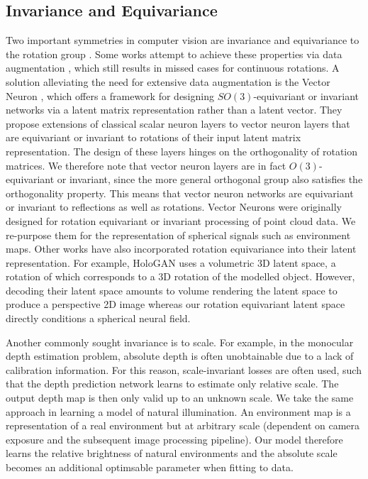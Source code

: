 \subsection{Invariance and Equivariance}\label{sec:litrevinv}

Two important symmetries in computer vision are invariance and equivariance to the rotation group \cite{bronstein_geometric_2021}. Some works attempt to achieve these properties via data augmentation \cite{yu_outdoor_2021, qi_pointnet_2017, sztrajman_high-dynamic-range_2020}, which still results in missed cases for continuous rotations. A solution alleviating the need for extensive data augmentation is the Vector Neuron \cite{deng_vector_2021}, which offers a framework for designing $SO(3)$-equivariant or invariant networks via a latent matrix representation rather than a latent vector. They propose extensions of classical scalar neuron layers to vector neuron layers that are equivariant or invariant to rotations of their input latent matrix representation. The design of these layers hinges on the orthogonality of rotation matrices. We therefore note that vector neuron layers are in fact $O(3)$-equivariant or invariant, since the more general orthogonal group also satisfies the orthogonality property. This means that vector neuron networks are equivariant or invariant to reflections as well as rotations. Vector Neurons were originally designed for rotation equivariant or invariant processing of point cloud data. We re-purpose them for the representation of spherical signals such as environment maps. Other works have also incorporated rotation equivariance into their latent representation. For example, HoloGAN \cite{nguyen2019hologan} uses a volumetric 3D latent space, a rotation of which corresponds to a 3D rotation of the modelled object. However, decoding their latent space amounts to volume rendering the latent space to produce a perspective 2D image whereas our rotation equivariant latent space directly conditions a spherical neural field.

Another commonly sought invariance is to scale. For example, in the monocular depth estimation problem, absolute depth is often unobtainable due to a lack of calibration information. For this reason, scale-invariant losses \cite{eigenDepthMapPrediction2014} are often used, such that the depth prediction network learns to estimate only relative scale. The output depth map is then only valid up to an unknown scale. We take the same approach in learning a model of natural illumination. An environment map is a representation of a real environment but at arbitrary scale (dependent on camera exposure and the subsequent image processing pipeline). Our model therefore learns the relative brightness of natural environments and the absolute scale becomes an additional optimsable parameter when fitting to data.